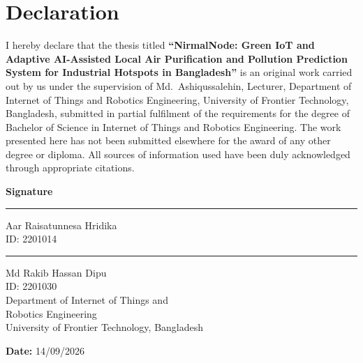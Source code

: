 \chapter*{Declaration}

I hereby declare that the thesis titled \textbf{``NirmalNode: Green IoT and Adaptive AI-Assisted Local Air Purification and Pollution Prediction System for Industrial Hotspots in Bangladesh''} is an original work carried out by us under the supervision of Md.\ Ashiqussalehin, Lecturer, Department of Internet of Things and Robotics Engineering, University of Frontier Technology, Bangladesh, submitted in partial fulfilment of the requirements for the degree of Bachelor of Science in Internet of Things and Robotics Engineering. The work presented here has not been submitted elsewhere for the award of any other degree or diploma. All sources of information used have been duly acknowledged through appropriate citations.

\vspace{2.5cm}

\noindent
\begin{minipage}[t]{0.48\textwidth}
\textbf{Signature}\\[1.4cm]
\hrule
\vspace{0.3cm}
Aar Raisatunnesa Hridika\\
ID: 2201014\\[0.8cm]
\hrule
\vspace{0.3cm}
Md Rakib Hassan Dipu\\
ID: 2201030\\[0.3cm]
Department of Internet of Things and\\
Robotics Engineering\\
University of Frontier Technology, Bangladesh
\end{minipage}

\vspace{1.5cm}
\noindent\textbf{Date:} 14/09/2026
